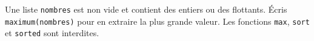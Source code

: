 Une liste \texttt{nombres} est non vide et contient des entiers ou des flottants. Écris \texttt{maximum(nombres)} pour en extraire la plus grande valeur. Les fonctions \texttt{max}, \texttt{sort} et \texttt{sorted} sont interdites.
